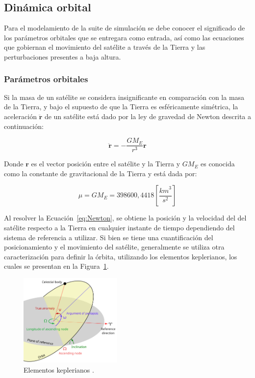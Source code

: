 \subsection{Dinámica orbital}

Para el modelamiento de la suite de simulación se debe conocer el significado de los parámetros orbitales que se entregara como entrada, así como las ecuaciones que gobiernan el movimiento del satélite a través de la Tierra y las perturbaciones presentes a baja altura.

\subsubsection{Parámetros orbitales}

Si la masa de un satélite se considera insignificante en comparación con la masa de la Tierra, y bajo el supuesto de que la Tierra es esféricamente simétrica, la aceleración \( \ddot{\mathbf{r}} \) de un satélite está dado por la ley de gravedad de Newton descrita a continuación:

\begin{equation}
	\ddot{\mathbf{r}} = -\frac{GM_E}{r^3} \mathbf{r}
	\label{eq:Newton}
\end{equation}

Donde $\mathbf{r}$ es el vector posición entre el satélite y la Tierra y $GM_E$ es conocida como la constante de gravitacional de la Tierra y está dada por:

\begin{equation}
	\mu = {GM_E} = 398600,4418  [\frac{{km}^3}{{s}^2}]
	\label{eq:cteGrav}
\end{equation}

Al resolver la Ecuación~\ref{eq:Newton}, se obtiene la posición y la velocidad del del satélite respecto a la Tierra en cualquier instante de tiempo dependiendo del sistema de referencia a utilizar. Si bien se tiene una cuantificación del posicionamiento y el movimiento del satélite, generalmente se utiliza otra caracterización para definir la órbita, utilizando los elementos keplerianos, los cuales se presentan en la Figura~\ref{fig:kepler}.

\begin{figure}[H]
	\centering    
	\includegraphics[width=0.45\textwidth]{keplerianos.png}
	\caption{Elementos keplerianos \cite{ref24}.}
	\label{fig:kepler}
\end{figure}

